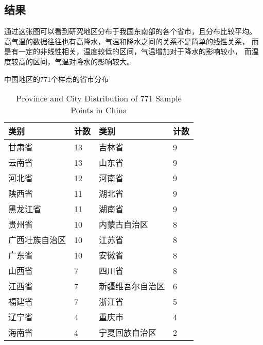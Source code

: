 \documentclass[AutoFakeBold]{LZUThesis-PgD&PhD}
\begin{document}
	\subsection{结果}
	
	通过这张图可以看到研究地区分布于我国东南部的各个省市，且分布比较平均。
	高气温的数据往往也有高降水，气温和降水之间的关系不是简单的线性关系，
	而是有一定的非线性相关，温度较低的区间，气温增加对于降水的影响较小，
	而温度较高的区间，气温对降水的影响较大。
	
	
	
	\begin{table}[H]
		\centering
		\caption{中国地区的771个样点的省市分布}
		\caption*{Province and City Distribution of 771 Sample Points in China}
		\begin{tabular}{ll|ll}
			\toprule
			\textbf{类别} & \textbf{计数} & \textbf{类别} & \textbf{计数} \\
			\midrule
			甘肃省 & 13 & 吉林省 & 9 \\
			云南省 & 13 & 山东省 & 9 \\
			河北省 & 12 & 河南省 & 9 \\
			陕西省 & 11 & 湖北省 & 9 \\
			黑龙江省 & 11 & 湖南省 & 9 \\
			贵州省 & 10 & 内蒙古自治区 & 8 \\
			广西壮族自治区 & 10 & 江苏省 & 8 \\
			广东省 & 10 & 安徽省 & 8 \\
			山西省 & 7 & 四川省 & 8 \\
			江西省 & 7 & 新疆维吾尔自治区 & 6 \\
			福建省 & 7 & 浙江省 & 5 \\
			辽宁省 & 4 & 重庆市 & 4 \\
			海南省 & 4 & 宁夏回族自治区 & 2 \\
			\bottomrule
		\end{tabular}
		
		\label{tab:category_count}
	\end{table}
	
\end{document}
